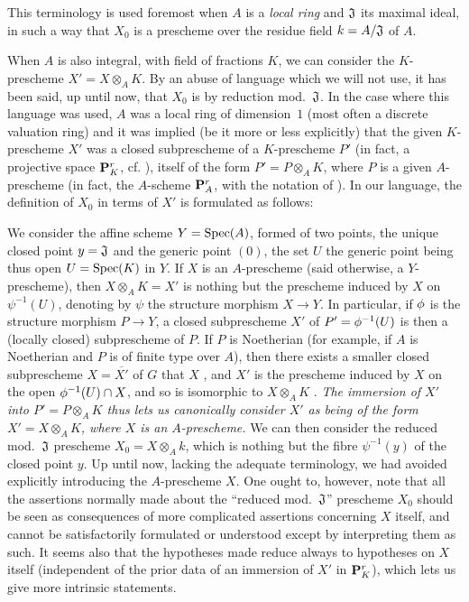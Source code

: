 \begin{env}
\label{1.3.7.2}
This terminology is used foremost when $A$ is a \emph{local ring} and $\mathfrak{J}$ its maximal ideal, in such a way that $X_0$ is a prescheme over the residue field $k=A/\mathfrak{J}$ of $A$.

When $A$ is also integral, with field of fractions $K$, we can consider the $K$-prescheme $X'=X\otimes_A K$.
By an abuse of language which we will not use, it has been said, up until now, that $X_0$ is  by reduction mod.~$\mathfrak{J}$.
In the case where this language was used, $A$ was a local ring of dimension~$1$ (most often a discrete valuation ring) and it was implied (be it more or less explicitly) that the given $K$-prescheme $X'$ was a closed subprescheme of a $K$-prescheme $P'$ (in fact, a projective space  $\mathbf{P}_K^r$, cf. ), itself of the form $P'=P\otimes_A K$, where $P$ is a given $A$-prescheme (in fact, the $A$-scheme $\mathbf{P}_A^r$, with the notation of ).
In our language, the definition of $X_0$ in terms of $X'$ is formulated as follows:

We consider the affine scheme $Y={\mathop{\mathrm{Spec}}\nolimits}(A)$, formed of two points, the unique closed point
$y=\mathfrak{J}$ and the generic point $(0)$, the set $U$  the generic point being thus open $U={\mathop{\mathrm{Spec}}\nolimits}(K)$ in $Y$.
If $X$ is an $A$-prescheme (said otherwise, a $Y$-prescheme), then $X\otimes_A K=X'$ is nothing but the prescheme induced by $X$ on $\psi^{-1}(U)$, denoting by $\psi$ the structure morphism $X\to Y$.
In particular, if $\phi$ is the structure morphism $P\to Y$, a closed subprescheme $X'$ of $P'=\phi^{-1}(U)$ is then a (locally closed) subprescheme of $P$.
If $P$ is Noetherian (for example, if $A$ is Noetherian and $P$ is of finite type over $A$), then there exists a smaller closed subprescheme $X=\overline{X'}$ of $G$ that  $X$ , and $X'$ is the prescheme induced by $X$ on the open $\phi^{-1}(U)\cap X$, and so is isomorphic to $X\otimes_A K$ .
\emph{The immersion of $X'$ into $P'=P\otimes_A K$ thus lets us canonically consider $X'$ as being of the form $X'=X\otimes_A K$, where $X$ is an $A$-prescheme.}
We can then consider the reduced mod.~$\mathfrak{J}$ prescheme $X_0=X\otimes_A k$, which is nothing but the fibre $\psi^{-1}(y)$ of the closed point $y$.
Up until now, lacking the adequate terminology, we had avoided explicitly introducing the $A$-prescheme $X$.
One ought to, however, note that all the assertions normally made about the ``reduced mod.~$\mathfrak{J}$'' prescheme  $X_0$ should be seen as consequences of more complicated assertions concerning $X$ itself, and cannot be satisfactorily formulated or understood except by interpreting them as such.
It seems also that the hypotheses made reduce always to hypotheses on $X$ itself (independent of the prior data of an immersion of $X'$ in $\mathbf{P}_K^r$), which lets us give more intrinsic statements.
\end{env}

